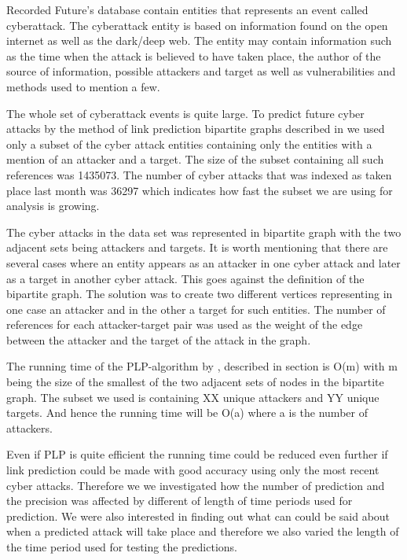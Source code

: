 Recorded Future's database contain entities that represents an event called cyberattack. The cyberattack entity is based on information found on the open internet as well as the dark/deep web. The entity may contain information such as the time when the attack is believed to have taken place, the author of the source of information, possible attackers and target as well as vulnerabilities and methods used to mention a few.

The whole set of cyberattack events is quite large. To predict future cyber attacks by the method of link prediction bipartite graphs described in  we used only a subset of the cyber attack entities containing only the entities with a mention of an attacker and a target. The size of the subset containing all such references was 1435073. The number of cyber attacks that was indexed as taken place last month was 36297 which indicates how fast the subset we are using for analysis is growing.

The cyber attacks in the data set was represented in bipartite graph with the two adjacent sets being attackers and targets. It is worth mentioning that there are several cases where an entity appears as an attacker in one cyber attack and later as a target in another cyber attack. This goes against the definition of the bipartite graph. The solution was to create two different vertices representing in one case an attacker and in the other a target for such entities. The number of references for each attacker-target pair was used as the weight of the edge between the attacker and the target of the attack in the graph.

The running time of the PLP-algorithm by \citet{plp}, described in section  is O(m) with m being the size of the smallest of the two adjacent sets of nodes in the bipartite graph. The subset we used is containing XX unique attackers and YY unique targets. And hence the running time will be O(a) where a is the number of attackers.

Even if PLP is quite efficient the running time could be reduced even further if link prediction could be made with good accuracy using only the most recent cyber attacks. Therefore we we investigated how the number of prediction and the precision was affected by different of length of time periods used for prediction. We were also interested in finding out what can could be said about when a predicted attack will take place and therefore we also varied the length of the time period used for testing the predictions.

